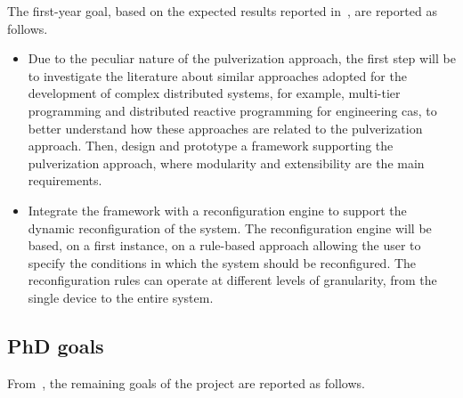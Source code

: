 \documentclass[12pt,a4paper]{article}
\begin{document}
The first-year goal,
based on the expected results reported in~,
are reported as follows.

\begin{itemize}
	\item Due to the peculiar nature of the pulverization approach,
		the first step will be to investigate the literature about similar approaches adopted for the development of complex distributed systems,
		for example, multi-tier programming and distributed reactive programming for engineering \ac{cas},
		to better understand how these approaches are related to the pulverization approach.
		Then, design and prototype a framework supporting the pulverization approach,
		where modularity and extensibility are the main requirements.
	\item Integrate the framework with a reconfiguration engine to support the dynamic reconfiguration of the system.
	    The reconfiguration engine will be based,
		on a first instance,
		on a rule-based approach allowing the user to specify the conditions in which the system should be reconfigured.
	    The reconfiguration rules can operate at different levels of granularity,
	    from the single device to the entire system.
\end{itemize}

\subsection{PhD goals}\label{subsec:phd-activities}

From~,
the remaining goals of the project are reported as follows.
\end{document}

